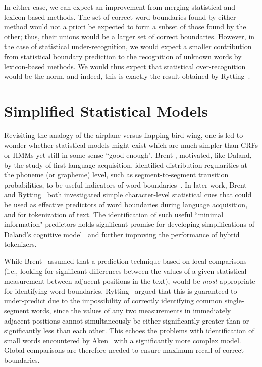 In either case, we can expect an improvement from merging statistical and lexicon-based methods. The set of correct word boundaries found by either method would not a priori be expected to form a subset of those found by the other; thus, their unions would be a larger set of correct boundaries. However, in the case of statistical under-recognition, we would expect a smaller contribution from statistical boundary prediction to the recognition of unknown words by lexicon-based methods. We would thus expect that statistical over-recognition would be the norm, and indeed, this is exactly the result obtained by Rytting~\cite{rytting04}.

\section{Simplified Statistical Models}

Revisiting the analogy of the airplane versus flapping bird wing, one is led to wonder whether statistical models might exist which are much simpler than CRFs or HMMs yet still in some sense ``good enough".  Brent \cite{brent99}, motivated, like Daland, by the study of first language acquisition, identified distribution regularities at the phoneme (or grapheme) level, such as segment-to-segment transition probabilities, to be useful indicators of word boundaries~\cite{brent96}. In later work, Brent~\cite{brent99} and Rytting~\cite{rytting04} both investigated simple character-level statistical cues that could be used as effective predictors of word boundaries during language acquisition, and for tokenization of text. The identification of such useful ``minimal information" predictors holds significant promise for developing simplifications of Daland's cognitive model~\cite{daland09} and further improving the performance of hybrid tokenizers.

While Brent~\cite{brent99} assumed that a prediction technique based on local comparisons (i.e., looking for significant differences between the values of a given statistical measurement between adjacent positions in the text), would be \textit{most} appropriate for identifying word boundaries, Rytting~\cite{rytting04} argued that this is guaranteed to under-predict due to the impossibility of correctly identifying common single-segment words, since the values of any two measurements in immediately adjacent positions cannot simultaneously be either significantly greater than or significantly less than each other. This echoes the problems with identification of small words encountered by Aken~\cite{aken11} with a significantly more complex model. Global comparisons are therefore needed to ensure maximum recall of correct boundaries.


